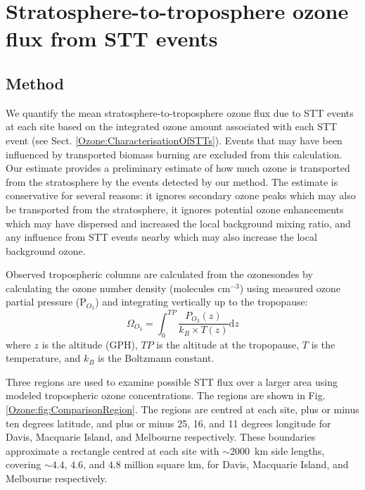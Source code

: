 \section{Stratosphere-to-troposphere ozone flux from STT events}
  \label{Ozone:STTevents}
  
  \subsection{Method}
    \label{Ozone:fluxcalc}
    We quantify the mean stratosphere-to-troposphere ozone flux due to STT events at each site based on the integrated ozone amount associated with each STT event (see Sect. \ref{Ozone:CharacterisationOfSTTs}).
    Events that may have been influenced by transported biomass burning are excluded from this calculation.
    Our estimate provides a preliminary estimate of how much ozone is transported from the stratosphere by the events detected by our method.
    The estimate is conservative for several reasons: it ignores secondary ozone peaks which may also be transported from the stratosphere, it ignores potential ozone enhancements which may have dispersed and increased the local background mixing ratio, and any influence from STT events nearby which may also increase the local background ozone.
    
    Observed tropospheric columns are calculated from the ozonesondes by calculating the ozone number density (molecules cm$^{-3}$) using measured ozone partial pressure (P$_{O_3}$) and integrating vertically up to the tropopause:
    \begin{equation*} \Omega_{O_3} = \int_{0}^{TP} \frac{P_{O_3}(z)}{k_B \times T(z)} \mathrm{d}z \end{equation*}
    where $z$ is the altitude (GPH), $TP$ is the altitude at the tropopause, $T$ is the temperature, and $k_B$ is the Boltzmann constant.
    
    Three regions are used to examine possible STT flux over a larger area using modeled tropospheric ozone concentrations.
    The regions are shown in Fig. \ref{Ozone:fig:ComparisonRegion}.
    The regions are centred at each site, plus or minus ten degrees latitude, and plus or minus 25, 16, and 11 degrees longitude for Davis, Macquarie Island, and Melbourne respectively.
    These boundaries approximate a rectangle centred at each site with $\sim 2000$~km side lengths, covering $\sim 4.4$, $4.6$, and $4.8$ million square km, for Davis, Macquarie Island, and Melbourne respectively.
    
